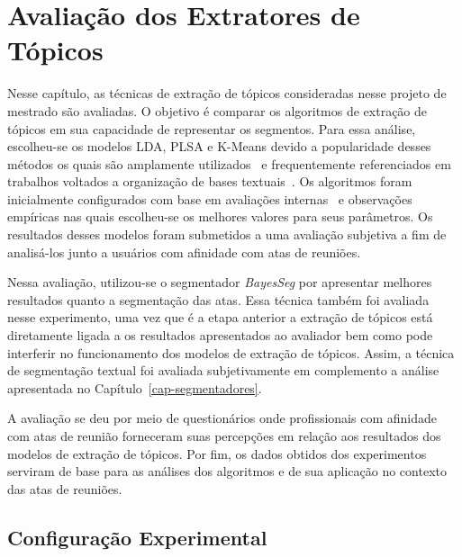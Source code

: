 \chapter{Avaliação dos Extratores de Tópicos}\label{cap-extratores}


Nesse capítulo, as técnicas de extração de tópicos consideradas nesse projeto de mestrado são avaliadas. O objetivo é comparar os algoritmos de extração de tópicos 
em sua capacidade de representar os segmentos. Para essa análise, escolheu-se os modelos LDA, PLSA e K-Means devido a popularidade desses métodos os quais são amplamente utilizados~\cite{DZhu20122} e frequentemente referenciados em trabalhos voltados a organização de bases textuais~\cite{Aggarwal2018, OCallaghan2015, Steyvers2007}.
Os algoritmos foram inicialmente configurados com base em avaliações internas~\cite{Hassani2017} e observações empíricas nas quais escolheu-se os melhores valores para seus parâmetros. Os resultados desses modelos foram submetidos a uma avaliação subjetiva a fim de analisá-los junto a usuários com afinidade com atas de reuniões. 

Nessa avaliação, utilizou-se o segmentador \textit{BayesSeg} por apresentar melhores resultados quanto a segmentação das atas. Essa técnica também foi avaliada nesse experimento, uma vez que é a etapa anterior a extração de tópicos está diretamente ligada a os resultados apresentados ao avaliador bem como pode interferir no funcionamento dos modelos de extração de tópicos. Assim, a técnica de segmentação textual foi avaliada subjetivamente em complemento a análise apresentada no Capítulo~\ref{cap-segmentadores}.  %

A avaliação se deu por meio de questionários onde profissionais com afinidade com atas de reunião forneceram suas percepções em relação aos resultados dos modelos de extração de tópicos. Por fim, os dados obtidos dos experimentos serviram de base para as análises dos algoritmos e de sua aplicação no contexto das atas de reuniões.

\section{Configuração Experimental}

